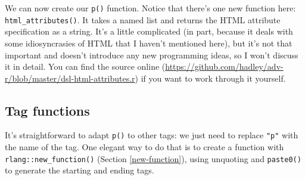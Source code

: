 \documentclass[]{book}
\newenvironment{Shaded}{\begin{snugshade}}{\end{snugshade}}
\newcommand{\CommentTok}[1]{\textcolor[rgb]{0.37,0.37,0.37}{\textit{#1}}}
\newcommand{\ControlFlowTok}[1]{\textcolor[rgb]{0.27,0.27,0.27}{\textbf{#1}}}
\newcommand{\DataTypeTok}[1]{\textcolor[rgb]{0.27,0.27,0.27}{#1}}
\newcommand{\DecValTok}[1]{\textcolor[rgb]{0.06,0.06,0.06}{#1}}
\newcommand{\KeywordTok}[1]{\textcolor[rgb]{0.27,0.27,0.27}{\textbf{#1}}}
\newcommand{\NormalTok}[1]{#1}
\newcommand{\OperatorTok}[1]{\textcolor[rgb]{0.43,0.43,0.43}{\textbf{#1}}}
\newcommand{\StringTok}[1]{\textcolor[rgb]{0.5,0.5,0.5}{#1}}
\renewcommand{\href}[2]{#2 (\url{#1})}
\begin{document}
We can now create our \texttt{p()} function. Notice that there's one new function here: \texttt{html\_attributes()}. It takes a named list and returns the HTML attribute specification as a string. It's a little complicated (in part, because it deals with some idiosyncrasies of HTML that I haven't mentioned here), but it's not that important and doesn't introduce any new programming ideas, so I won't discuss it in detail. You can find the \href{https://github.com/hadley/adv-r/blob/master/dsl-html-attributes.r}{source online} if you want to work through it yourself.

\begin{Shaded}
\end{Shaded}

\hypertarget{tag-functions}{%
\subsection{Tag functions}\label{tag-functions}}

It's straightforward to adapt \texttt{p()} to other tags: we just need to replace \texttt{"p"} with the name of the tag. One elegant way to do that is to create a function with \texttt{rlang::new\_function()} (Section \ref{new-function}), using unquoting and \texttt{paste0()} to generate the starting and ending tags.
\end{document}
